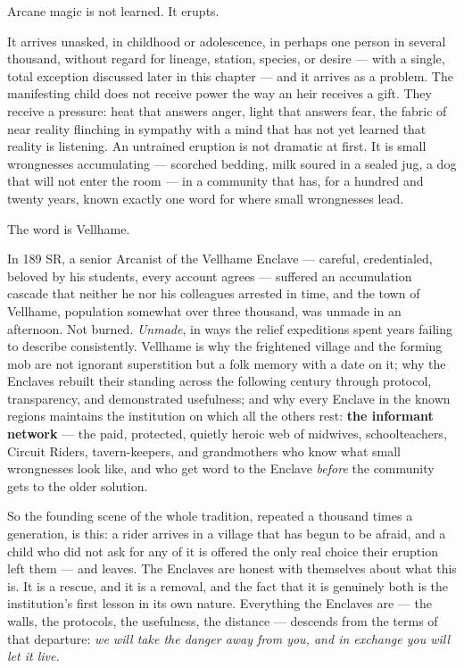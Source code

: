 Arcane magic is not learned. It erupts.

It arrives unasked, in childhood or adolescence, in perhaps one person in several thousand, without regard for lineage, station, species, or desire --- with a single, total exception discussed later in this chapter --- and it arrives as a problem. The manifesting child does not receive power the way an heir receives a gift. They receive a pressure: heat that answers anger, light that answers fear, the fabric of near reality flinching in sympathy with a mind that has not yet learned that reality is listening. An untrained eruption is not dramatic at first. It is small wrongnesses accumulating --- scorched bedding, milk soured in a sealed jug, a dog that will not enter the room --- in a community that has, for a hundred and twenty years, known exactly one word for where small wrongnesses lead.

The word is Vellhame.

In 189 SR, a senior Arcanist of the Vellhame Enclave --- careful, credentialed, beloved by his students, every account agrees --- suffered an accumulation cascade that neither he nor his colleagues arrested in time, and the town of Vellhame, population somewhat over three thousand, was unmade in an afternoon. Not burned. \textit{Unmade}, in ways the relief expeditions spent years failing to describe consistently. Vellhame is why the frightened village and the forming mob are not ignorant superstition but a folk memory with a date on it; why the Enclaves rebuilt their standing across the following century through protocol, transparency, and demonstrated usefulness; and why every Enclave in the known regions maintains the institution on which all the others rest: \textbf{the informant network} --- the paid, protected, quietly heroic web of midwives, schoolteachers, Circuit Riders, tavern-keepers, and grandmothers who know what small wrongnesses look like, and who get word to the Enclave \textit{before} the community gets to the older solution.

So the founding scene of the whole tradition, repeated a thousand times a generation, is this: a rider arrives in a village that has begun to be afraid, and a child who did not ask for any of it is offered the only real choice their eruption left them --- and leaves. The Enclaves are honest with themselves about what this is. It is a rescue, and it is a removal, and the fact that it is genuinely both is the institution's first lesson in its own nature. Everything the Enclaves are --- the walls, the protocols, the usefulness, the distance --- descends from the terms of that departure: \textit{we will take the danger away from you, and in exchange you will let it live.}

